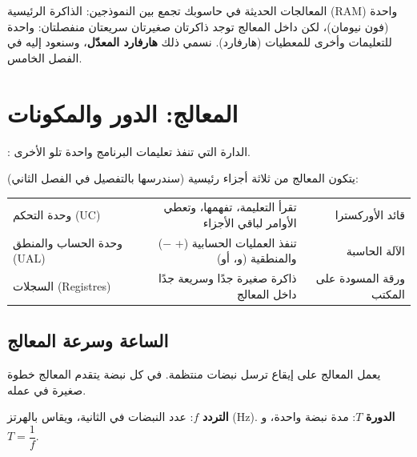 \begin{hal}
    المعالجات الحديثة في حاسوبك تجمع بين النموذجين: الذاكرة الرئيسية \textenglish{(RAM)} واحدة
    (فون نيومان)، لكن داخل المعالج توجد ذاكرتان صغيرتان سريعتان منفصلتان: واحدة للتعليمات
    وأخرى للمعطيات (هارفارد). نسمي ذلك \textbf{هارفارد المعدّل}، وسنعود إليه في الفصل الخامس.
\end{hal}

\section{المعالج: الدور والمكونات}

\begin{tarif}
    : الدارة التي تنفذ تعليمات البرنامج واحدة تلو الأخرى.
\end{tarif}

يتكون المعالج من ثلاثة أجزاء رئيسية (سندرسها بالتفصيل في الفصل الثاني):

\begin{center}
\begin{tabularx}{\linewidth}{|>{\centering\arraybackslash}p{4.2cm}|R|R|}
    \hline
     &  &  \\ \hline
    وحدة التحكم \textenglish{(UC)} & تقرأ التعليمة، تفهمها، وتعطي الأوامر لباقي الأجزاء & قائد الأوركسترا \\ \hline
    وحدة الحساب والمنطق \textenglish{(UAL)} & تنفذ العمليات الحسابية (\textenglish{+ −}) والمنطقية (و، أو) & الآلة الحاسبة \\ \hline
    السجلات \textenglish{(Registres)} & ذاكرة صغيرة جدًا وسريعة جدًا داخل المعالج & ورقة المسودة على المكتب \\ \hline
\end{tabularx}
\end{center}

\subsection{الساعة وسرعة المعالج}
يعمل المعالج على إيقاع  ترسل نبضات منتظمة. في كل نبضة يتقدم
المعالج خطوة صغيرة في عمله.

\begin{tarif}
    \textbf{التردد} $f$: عدد النبضات في الثانية، ويقاس بالهرتز \textenglish{(Hz)}.
    \textbf{الدورة} $T$: مدة نبضة واحدة، و$T = \dfrac{1}{f}$.
\end{tarif}

